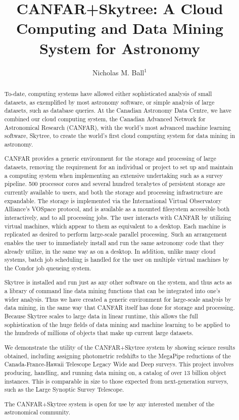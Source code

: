\documentclass[11pt,twoside]{article}
\begin{document}
\title{CANFAR+Skytree: A Cloud Computing and Data Mining System for Astronomy}
\author{Nicholas M. Ball$^1$
}

\begin{abstract}
To-date, computing systems have allowed either sophisticated analysis of small datasets, as exemplified by most astronomy software, or simple analysis of large datasets, such as database queries. At the Canadian Astronomy Data Centre, we have combined our cloud computing system, the Canadian Advanced Network for Astronomical Research (CANFAR), with the world's most advanced machine learning software, Skytree, to create the world's first cloud computing system for data mining in astronomy.

CANFAR provides a generic environment for the storage and processing of large datasets, removing the requirement for an individual or project to set up and maintain a computing system when implementing an extensive undertaking such as a survey pipeline. 500 processor cores and several hundred terabytes of persistent storage are currently available to users, and both the storage and processing infrastructure are expandable. The storage is implemented via the International Virtual Observatory Alliance's VOSpace protocol, and is available as a mounted filesystem accessible both interactively, and to all processing jobs. The user interacts with CANFAR by utilizing virtual machines, which appear to them as equivalent to a desktop. Each machine is replicated as desired to perform large-scale parallel processing. Such an arrangement enables the user to immediately install and run the same astronomy code that they already utilize, in the same way as on a desktop. In addition, unlike many cloud systems, batch job scheduling is handled for the user on multiple virtual machines by the Condor job queueing system.

Skytree is installed and run just as any other software on the system, and thus acts as a library of command line data mining functions that can be integrated into one's wider analysis. Thus we have created a generic environment for large-scale analysis by data mining, in the same way that CANFAR itself has done for storage and processing. Because Skytree scales to large data in linear runtime, this allows the full sophistication of the huge fields of data mining and machine learning to be applied to the hundreds of millions of objects that make up current large datasets.

We demonstrate the utility of the CANFAR+Skytree system by showing science results obtained, including assigning photometric redshifts to the MegaPipe reductions of the Canada-France-Hawaii Telescope Legacy Wide and Deep surveys. This project involves producing, handling, and running data mining on, a catalog of over 13 billion object instances. This is comparable in size to those expected from next-generation surveys, such as the Large Synoptic Survey Telescope.

The CANFAR+Skytree system is open for use by any interested member of the astronomical community.
\end{abstract}
\end{document}
